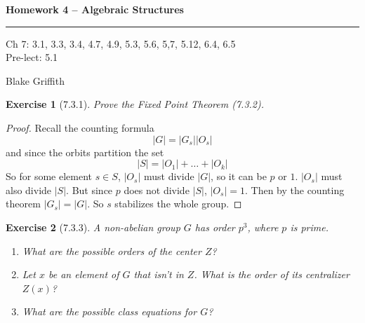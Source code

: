 \documentclass[12pt]{article}
\newtheorem*{exer}{Exercise}
\begin{document}
\textbf{Homework 4 -- Algebraic Structures} \\

\hrule

\begin{minipage}{.80\linewidth}
    \flushleft
    Ch 7: 3.1, 3.3, 3.4, 4.7, 4.9, 5.3, 5.6, 5,7, 5.12, 6.4, 6.5 \\
    Pre-lect: 5.1 \\
\end{minipage}
\begin{minipage}{.20\linewidth}
    \flushright
    Blake Griffith
\end{minipage}

\begin{exer}[7.3.1]

    Prove the Fixed Point Theorem (7.3.2).

\end{exer}

\begin{proof}

    Recall the counting formula
    \[
        |G| = |G_s||O_s|
    \]
    and since the orbits partition the set
    \[
        |S| = |O_1| + \dots + |O_k|
    \]
    So for some element $s \in S$, $|O_s|$ must divide $|G|$, so it can be
    $p$ or $1$. $|O_s|$ must also divide $|S|$. But since $p$ does not
    divide $|S|$, $|O_s| = 1$. Then by the counting theorem $|G_s| =
    |G|$. So $s$ stabilizes the whole group.

\end{proof}


\begin{exer}[7.3.3]

    A non-abelian group $G$ has order $p^3$, where $p$ is prime.

    \begin{enumerate}
        \item What are the possible orders of the center $Z$?

        \item Let $x$ be an element of $G$ that isn't in $Z$. What is
            the order of its centralizer $Z(x)$?

        \item What are the possible class equations for $G$?
    \end{enumerate}

\end{exer}
\end{document}
